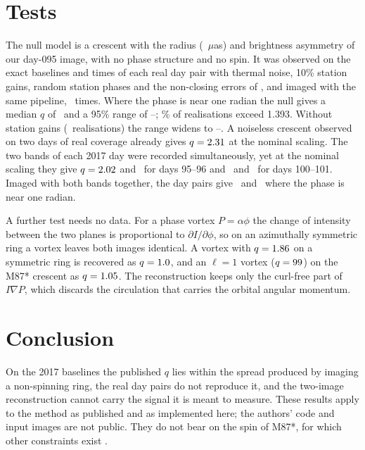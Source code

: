 \documentclass[RNAAS]{aastex631}
\begin{document}
\section{Tests}
\label{sec:tests}
The null model is a crescent with the radius (\oamspinRealRingRadius~$\mu$as) and brightness
asymmetry of our day-095 image, with no phase structure and no spin. It was observed on the exact
baselines and times of each real day pair with thermal noise, 10\% station gains, random station
phases and the non-closing errors of \citet{eht3}, and imaged with the same pipeline,
\oamspinSynNoneN\ times. Where the phase is near one radian the null gives a median $q$ of
\oamspinSynNoneMedPone\ and a 95\% range of \oamspinSynNoneLoPone--\oamspinSynNoneHiPone;
\oamspinSynNoneExceedPone\% of realisations exceed 1.393. Without station gains
(\oamspinSynCalN\ realisations) the range widens to \oamspinSynCalLoPone--\oamspinSynCalHiPone.
A noiseless crescent observed on two days of real coverage already gives $q=2.31$ at the
nominal scaling. The two bands of each 2017 day were recorded simultaneously, yet at the nominal
scaling they give $q=2.02$ and \oamspinRealROneAHi\ for days 95--96 and
\oamspinRealROneBLo\ and \oamspinRealROneBHi\ for days 100--101. Imaged with both bands together,
the day pairs give \oamspinRealCombAPone\ and \oamspinRealCombBPone\ where the phase is near one
radian.

A further test needs no data. For a phase vortex $P=\alpha\phi$ the change of intensity between
the two planes is proportional to $\partial I/\partial\phi$, so on an azimuthally symmetric ring a
vortex leaves both images identical. A vortex with $q=1.86$ on a symmetric ring
is recovered as $q=1.0$, and an $\ell=1$ vortex ($q=99$) on
the M87* crescent as $q=1.05$. The reconstruction keeps only the curl-free
part of $I\nabla P$, which discards the circulation that carries the orbital angular momentum.

\section{Conclusion}
\label{sec:conclusion}
On the 2017 baselines the published $q$ lies within the spread produced by imaging a
non-spinning ring, the real day pairs do not reproduce it, and the two-image reconstruction cannot
carry the signal it is meant to measure. These results apply to the method as published and as
implemented here; the authors' code and input images are not public. They do not bear on the spin
of M87*, for which other constraints exist \citep{eht1}.
\end{document}
